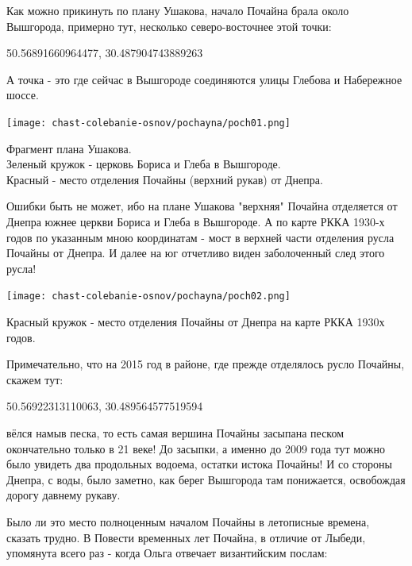 Как можно прикинуть по плану Ушакова, начало Почайна брала около Вышгорода, примерно тут,  несколько северо-восточнее этой точки:

50.56891660964477, 30.487904743889263

А точка - это где сейчас в Вышгороде соединяются улицы Глебова и Набережное шоссе.

\newpage

\vspace*{\fill}

\begin{center}
\texttt{[image: chast-colebanie-osnov/pochayna/poch01.png]}

Фрагмент плана Ушакова.\\
Зеленый кружок - церковь Бориса и Глеба в Вышгороде.\\
Красный - место отделения Почайны (верхний рукав) от Днепра.
\end{center}
\vspace*{\fill}

\newpage


Ошибки быть не может, ибо на плане Ушакова "верхняя" Почайна отделяется от Днепра южнее церкви Бориса и Глеба в Вышгороде. А по карте РККА 1930-х годов по указанным мною координатам - мост в верхней части отделения русла Почайны от Днепра. И далее на юг отчетливо виден заболоченный след этого русла!

\begin{center}
\texttt{[image: chast-colebanie-osnov/pochayna/poch02.png]}

Красный кружок - место отделения Почайны от Днепра на карте РККА 1930х годов.
\end{center}
\vspace*{\fill}

Примечательно, что на 2015 год в районе, где прежде отделялось русло Почайны, скажем тут:

50.56922313110063, 30.489564577519594

вёлся намыв песка, то есть самая вершина Почайны засыпана песком окончательно только в 21 веке! До засыпки, а именно до 2009 года тут можно было увидеть два продольных водоема, остатки истока Почайны! И со стороны Днепра, с воды, было заметно, как берег Вышгорода там понижается, освобождая дорогу давнему рукаву.

Было ли это место полноценным началом Почайны в летописные времена, сказать трудно. В Повести временных лет Почайна, в отличие от Лыбеди, упомянута всего раз - когда Ольга отвечает византийским послам:

